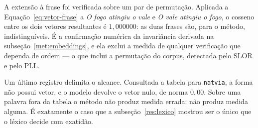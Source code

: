 A extensão à frase foi verificada sobre um par de permutação. Aplicada a
Equação~\ref{eq:vetor-frase} a \emph{O fogo atingiu o vale} e \emph{O vale atingiu o fogo}, o
cosseno entre os dois vetores resultantes é $1{,}000000$: as duas frases são, para o método,
indistinguíveis. É a confirmação numérica da invariância derivada na
subseção~\ref{met:embeddings}, e ela exclui a medida de qualquer verificação que dependa de
ordem --- o que inclui a permutação do corpus, detectada pelo SLOR e pelo PLL.

Um último registro delimita o alcance. Consultada a tabela para \texttt{natvia}, a forma não
possui vetor, e o modelo devolve o vetor nulo, de norma $0{,}00$. Sobre uma palavra fora da
tabela o método não produz medida errada: não produz medida alguma. É exatamente o caso que a
subseção~\ref{res:lexico} mostrou ser o único que o léxico decide com exatidão.

%
